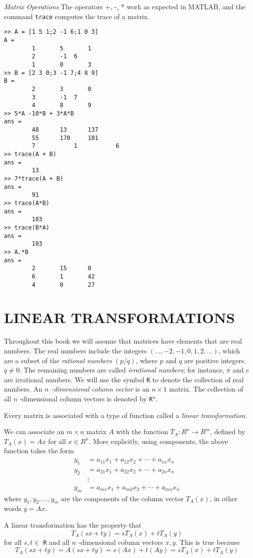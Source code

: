 \documentclass[../main.tex]{subfiles}
\begin{document}
\begin{example}\emph{Matrix Operations}
\label{exm:exm_1_5}
The operators +, -, * work as expected in MATLAB, and the command \texttt{trace} computes the trace of a matrix.

\begin{lstlisting}[numbers=none,frame=none]
>> A = [1 5 1;2 -1 6;1 0 3]
A =
		1		5		1
		2		-1	6
		1		0		3
>> B = [2 3 0;3 -1 7;4 8 9]
B =
		2		3		0
		3		-1	7
		4		8		9
>> 5*A -10*B + 3*A*B
ans =
		48 		13 		137
		55 		170		101
		7			1			6
>> trace(A + B)
ans =
		13
>> 7*trace(A + B)
ans =
		91
>> trace(A*B)
ans =
		103
>> trace(B*A)
ans =
		103
>> A.*B
ans =
		2 		15 		0
		6 		1 		42
		4 		0 		27
\end{lstlisting}
\end{example}

\section[Linear Transformations]{LINEAR TRANSFORMATIONS}
\label{sec:sec_1_2}
Throughout this book we will assume that matrices have elements that are real numbers. The real numbers include the integers $(\ldots,-2,-1,0,1,2, \ldots)$, which are a subset of the \emph{rational numbers} $(p / q)$, where $p$ and $q$ are positive integers. $q \neq 0$. The remaining numbers are called \emph{irrational numbers}; for instance, $\pi$ and $e$ are irrational numbers. We will use the symbol \texttt{R} to denote the collection of real numbers. An \emph{$n$ -dimensional column vector} is an $n \times 1$ matrix. The collection of all $n$ -dimensional column vectors is denoted by \texttt{R}$^{n}$.

Every matrix is associated with a type of function called a \emph{linear transformation}.

\begin{definition} 
	\label{defn:defn_1_9}
	We can associate an $m \times n$ matrix $A$ with the function $T_{A}: R^{n} \rightarrow R^{m}$, defined by $T_{A}(x)=A x$ for all $x \in R^{n} .$ More explicitly, using components, the above function takes the form
$$
\begin{aligned}
y_{1} &=a_{11} x_{1}+a_{12} x_{2}+\cdots+a_{1 n} x_{n} \\
y_{2} &=a_{21} x_{1}+a_{22} x_{2}+\cdots+a_{2 n} x_{n} \\
&\vdots \\
y_{m} &=a_{m 1} x_{1}+a_{m 2} x_{2}+\cdots+a_{m n} x_{n}
\end{aligned}
$$
where $y_{1}, y_{2}, \ldots, y_{m}$ are the components of the column vector $T_{A}(x)$, in other words $y=A x$.

A linear transformation has the property that
$$
T_{A}(s x+t y)=s T_{A}(x)+t T_{A}(y)
$$
for all $s, t \in$ \texttt{R} and all $n$ -dimensional column vectors $x, y .$ This is true because
$$
T_{A}(s x+t y)=A(s x+t y)=s(A x)+t(A y)=s T_{A}(x)+t T_{A}(y)
$$
\end{definition}
\end{document}
